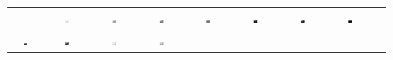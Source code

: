 \documentclass[a4paper,10pt]{article}
\begin{document}
\begin{figure}
\begin{tabular}{ccccccccc}
&
\includegraphics[width=0.1055\textwidth]{images/plant_star}\!\!\!\!\!\!
&
\includegraphics[width=0.1055\textwidth]{images/plant_jiep}\!\!\!\!\!\!
&
\includegraphics[width=0.1055\textwidth]{images/plant_lime}\!\!\!\!\!\!
&
\includegraphics[width=0.1055\textwidth]{images/plant_msr}\!\!\!\!\!\!
&
\includegraphics[width=0.1055\textwidth]{images/plant_N4}\!\!\!\!\!\!
&
\includegraphics[width=0.1055\textwidth]{images/plant_pie}\!\!\!\!\!\!
&
\includegraphics[width=0.1055\textwidth]{images/plant_srie}%
\\
\includegraphics[width=0.1055\textwidth]{images/porche_gray}\!\!\!\!\!\!
&
\includegraphics[width=0.1055\textwidth]{images/porche_dgkv}\!\!\!\!\!\!
&
\includegraphics[width=0.1055\textwidth]{images/porche_star}\!\!\!\!\!\!
&
\includegraphics[width=0.1055\textwidth]{images/porche_jiep}\!\!\!\!\!\!

\end{tabular}
\end{figure}
\end{document}
